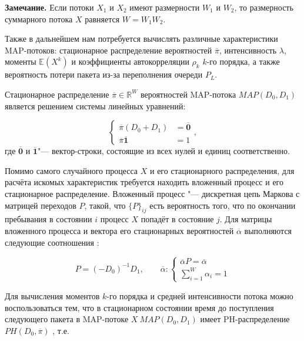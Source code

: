 \textbf{Замечание.} Если потоки $X_1$ и $X_2$ имеют размерности $W_1$ и $W_2$, то размерность суммарного потока $X$ равняется $W = W_1 W_2$.

Также в дальнейшем нам потребуется вычислять различные характеристики MAP-потоков: стационарное распределение вероятностей $\overline{\pi}$, интенсивность $\lambda$, моменты $\mathbb{E}(X^{k})$ и коэффициенты автокорреляции $\rho_k$ $k$-го порядка, а также вероятность потери пакета из-за переполнения очереди $P_L$.

Стационарное распределение $\overline{\pi} \in \mathbb{R}^W$ вероятностей MAP-потока $MAP(D_0, D_1)$ является решением системы линейных уравнений:

\begin{equation}
	\label{eq:ch4_map_pdf}
	\begin{cases}
		\overline{\pi}(D_0 + D_1) &= \overline{\mathbf{0}}\\
		\overline{\pi}\overline{\mathbf{1}} &= 1
	\end{cases},
\end{equation} 
где $\overline{\mathbf{0}}$ и $\overline{\mathbf{1}}$"--- вектор-строки, состоящие из всех нулей и единиц соответственно. 

Помимо самого случайного процесса $X$ и его стационарного распределения, для расчёта искомых характеристик требуется находить вложенный процесс и его стационарное распределение. Вложенный процесс "--- дискретная цепь Маркова с матрицей переходов $P$, такой, что $\{P\}_{ij}$ есть вероятность того, что по окончании пребывания в состоянии $i$ процесс $X$ попадёт в состояние $j$. Для матрицы вложенного процесса и вектора его стационарных вероятностей $\overline{\alpha}$ выполняются следующие соотношения \cite{Horvath2005}:

\begin{equation}
\label{eq:ch4_map_embedded_process}
	P = (-D_0)^{-1} D_1, \qquad
	\overline{\alpha}: \begin{cases}
		\overline{\alpha} P = \overline{\alpha} \\
		\sum\limits_{i=1}^{W} \alpha_i = 1
 	\end{cases}
\end{equation}

Для вычисления моментов $k$-го порядка и средней интенсивности потока можно воспользоваться тем, что в стационарном состоянии время до поступления следующего пакета в MAP-потоке $X~MAP(D_0, D_1)$ имеет PH-распределение $PH(D_0, \overline{\pi})$ \cite{Horvath2005}, т.е. 

